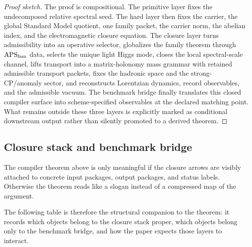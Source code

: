 \begin{proof}[Proof sketch]
The proof is compositional. The primitive layer fixes the undecomposed relative spectral seed. The hard layer then fixes the carrier, the global Standard Model quotient, one family packet, the carrier norm, the abelian index, and the electromagnetic closure equation. The closure layer turns admissibility into an operative selector, globalizes the family theorem through $\mathrm{APS}_{\mathrm{fam}}$ data, selects the unique light Higgs mode, closes the local spectral-scale channel, lifts transport into a matrix-holonomy mass grammar with retained admissible transport packets, fixes the hadronic space and the strong-CP/anomaly sector, and reconstructs Lorentzian dynamics, record observables, and the admissible vacuum. The benchmark bridge finally translates this closed compiler surface into scheme-specified observables at the declared matching point. What remains outside these three layers is explicitly marked as conditional downstream output rather than silently promoted to a derived theorem.
\end{proof}

\subsection{Closure stack and benchmark bridge}

The compiler theorem above is only meaningful if the closure arrows are visibly attached to concrete input packages, output packages, and status labels. Otherwise the theorem reads like a slogan instead of a compressed map of the argument.

The following table is therefore the structural companion to the theorem: it records which objects belong to the closure stack proper, which objects belong only to the benchmark bridge, and how the paper expects those layers to interact.

